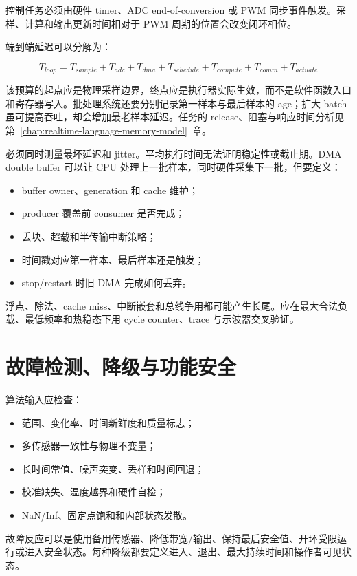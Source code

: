 控制任务必须由硬件 timer、ADC end-of-conversion 或 PWM 同步事件触发。采样、计算和输出更新时间相对于 PWM 周期的位置会改变闭环相位。

端到端延迟可以分解为：

\begin{equation}
  T_{loop}=T_{sample}+T_{adc}+T_{dma}+T_{schedule}
          +T_{compute}+T_{comm}+T_{actuate}
\end{equation}

该预算的起点应是物理采样边界，终点应是执行器实际生效，而不是软件函数入口和寄存器写入。批处理系统还要分别记录第一样本与最后样本的 age；扩大 batch 虽可提高吞吐，却会增加最老样本延迟。任务的 release、阻塞与响应时间分析见第~\ref{chap:realtime-language-memory-model}~章。

必须同时测量最坏延迟和 jitter。平均执行时间无法证明稳定性或截止期。DMA double buffer 可以让 CPU 处理上一批样本，同时硬件采集下一批，但要定义：

\begin{itemize}
  \item buffer owner、generation 和 cache 维护；
  \item producer 覆盖前 consumer 是否完成；
  \item 丢块、超载和半传输中断策略；
  \item 时间戳对应第一样本、最后样本还是触发；
  \item stop/restart 时旧 DMA 完成如何丢弃。
\end{itemize}

浮点、除法、cache miss、中断嵌套和总线争用都可能产生长尾。应在最大合法负载、最低频率和热稳态下用 cycle counter、trace 与示波器交叉验证。

\section{故障检测、降级与功能安全}

算法输入应检查：

\begin{itemize}
  \item 范围、变化率、时间新鲜度和质量标志；
  \item 多传感器一致性与物理不变量；
  \item 长时间常值、噪声突变、丢样和时间回退；
  \item 校准缺失、温度越界和硬件自检；
  \item NaN/Inf、固定点饱和和内部状态发散。
\end{itemize}

故障反应可以是使用备用传感器、降低带宽/输出、保持最后安全值、开环受限运行或进入安全状态。每种降级都要定义进入、退出、最大持续时间和操作者可见状态。

